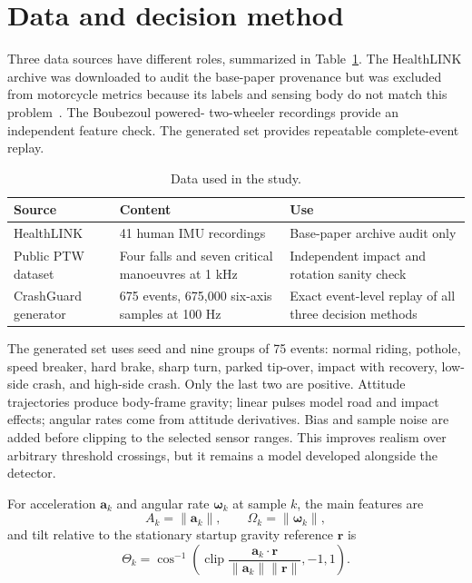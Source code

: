 \documentclass[12pt,a4paper]{article}
\begin{document}
\section{Data and decision method}

Three data sources have different roles, summarized in Table~\ref{tab:data}.
The HealthLINK archive was downloaded to audit the base-paper provenance but
was excluded from motorcycle metrics because its labels and sensing body do
not match this problem~\cite{healthlinkarchive}. The Boubezoul powered-
two-wheeler recordings provide an independent feature check. The generated
set provides repeatable complete-event replay.

\begin{table}[H]
\centering
\small
\caption{Data used in the study.}
\label{tab:data}
\begin{tabularx}{\textwidth}{@{}p{}p{}X@{}}
\toprule
Source & Content & Use \\
\midrule
HealthLINK & 41 human IMU recordings & Base-paper archive audit only \\
Public PTW dataset & Four falls and seven critical manoeuvres at 1 kHz &
Independent impact and rotation sanity check \\
CrashGuard generator & 675 events, 675,000 six-axis samples at 100 Hz & Exact
event-level replay of all three decision methods \\
\bottomrule
\end{tabularx}
\end{table}

The generated set uses seed \SimulationSeed{} and nine groups of 75 events:
normal riding, pothole, speed breaker, hard brake, sharp turn, parked
tip-over, impact with recovery, low-side crash, and high-side crash. Only the
last two are positive. Attitude trajectories produce body-frame gravity;
linear pulses model road and impact effects; angular rates come from attitude
derivatives. Bias and sample noise are added before clipping to the selected
sensor ranges. This improves realism over arbitrary threshold crossings, but
it remains a model developed alongside the detector.

For acceleration $\mathbf a_k$ and angular rate $\boldsymbol\omega_k$ at
sample $k$, the main features are
\begin{equation}
 A_k=\|\mathbf a_k\|,\qquad
 \Omega_k=\|\boldsymbol\omega_k\|,
\end{equation}
and tilt relative to the stationary startup gravity reference $\mathbf r$ is
\begin{equation}
 \Theta_k=\cos^{-1}\!\left(
 \operatorname{clip}\frac{\mathbf a_k\cdot\mathbf r}
 {\|\mathbf a_k\|\|\mathbf r\|},-1,1\right).
\end{equation}
\end{document}
